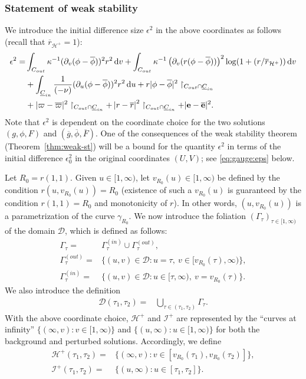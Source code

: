 \documentclass[10pt, reqno]{amsart}
\theoremstyle{definition}
\theoremstyle{remark}
\theoremstyle{conjecture}
\numberwithin{equation}{section}
\newcommand{\abs}[1]{\vert#1\vert}
\newcommand{\set}[1]{\{#1\}}
\newcommand{\ud}{\mathrm{d}}
\newcommand{\rd}{\partial}
\newcommand{\0}{\emptyset}
\newcommand{\gmm}{\gamma}
\newcommand{\Gmm}{\Gamma}
\newcommand{\eps}{\epsilon}
\newcommand{\kpp}{\kappa}
\newcommand{\bfe}{{\bf e}}
\newcommand{\calD}{\mathcal D}
\newcommand{\calH}{\mathcal H}
\newcommand{\calI}{\mathcal I}
\newcommand{\uC}{\underline{C}}
\newcommand{\dur}{\nu}
\newcommand{\EH}{\calH^{+}}
\newcommand{\e}{\bfe}							%
\newcommand{\NI}{\calI^{+}}						%
\newcommand{\gbg}{\overline{g}}					%
\newcommand{\Fbg}{\overline{F}}					%
\newcommand{\phibg}{\overline{\phi}}				%
\newcommand{\rbg}{\overline{r}}					%
\newcommand{\varpibg}{\overline{\varpi}}				%
\newcommand{\ebg}{\overline{\e}}					%
\newcommand{\Abs}[1]{\left\vert #1 \right\vert}
\begin{document}
\subsubsection*{Statement of weak stability}
We introduce the initial difference size $\eps^{2}$ in the above coordinates as follows (recall that $\rbg_{\EH} = 1$):
\begin{equation} \label{eq:eps-def}
\begin{aligned}
	\eps^{2} 
= 	& \int_{C_{out}} \kpp^{-1} (\rd_{v} (\phi - \phibg))^{2} r^{2} \, \ud v 
	+ \int_{C_{out}} \kpp^{-1} \left( \rd_{v} (r (\phi - \phibg)) \right)^{2} \log(1+(r/\rbg_{\EH})) \, \ud v \\
	& + \int_{\uC_{in}} \frac{1}{(-\dur)} (\rd_{u} (\phi - \phibg))^{2} r^{2} \, \ud u  
	+ r \abs{\phi - \phibg}^{2} \restriction_{C_{out} \cap \uC_{in}}		\\
	& + \abs{\varpi - \varpibg}^{2} \restriction_{C_{out} \cap \uC_{in}}
	+ \Abs{r - \rbg}^{2} \restriction_{C_{out} \cap \uC_{in}} 
	+ \abs{\e - \ebg}^{2} .
\end{aligned}
\end{equation}
Note that $\eps^{2}$ is dependent on the coordinate choice for the two solutions $(g, \phi, F)$ and $(\gbg, \phibg, \Fbg)$. One of the consequences of the weak stability theorem (Theorem~\ref{thm:weak-st}) will be a bound for the quantity $\eps^{2}$ in terms of the initial difference $\eps_{0}^{2}$ in the original coordinates $(U, V)$; see \eqref{eq:gauge:eps} below.

Let $R_{0} = r(1, 1)$.  Given $u \in [1, \infty)$, let $v_{R_{0}}(u) \in [1, \infty)$ be defined by the condition $r(u, v_{R_{0}}(u)) = R_{0}$ (existence of such a $v_{R_{0}}(u)$ is guaranteed by the condition $r(1, 1) = R_{0}$ and monotonicity of $r$). In other words, $(u, v_{R_{0}}(u))$ is a parametrization of the curve $\gmm_{R_{0}}$. We now introduce the foliation $(\Gmm_{\tau})_{\tau \in [1, \infty)}$ of the domain $\calD$, which is defined as follows:
\begin{align*}
	\Gmm_{\tau} = & \Gmm_{\tau}^{(in)} \cup \Gmm_{\tau}^{(out)}, \\
	\Gmm_{\tau}^{(out)} = & \set{(u, v) \in \calD : u = \tau, \ v \in [v_{R_{0}}(\tau), \infty)}, \\
	\Gmm_{\tau}^{(in)} = & \set{(u, v) \in \calD : u \in [\tau, \infty), \ v  = v_{R_{0}}(\tau)}.
\end{align*}
We also introduce the definition
\begin{align*}
	\calD(\tau_{1}, \tau_{2}) =& \bigcup_{\tau \in (\tau_{1}, \tau_{2})} \Gmm_{\tau}.
\end{align*}
With the above coordinate choice, $\EH$ and $\NI$ are represented by the ``curves at infinity'' $\set{(\infty, v) : v \in [1, \infty)}$ and $\set{(u, \infty) : u \in [1, \infty)}$ for both the background and perturbed solutions. Accordingly, we define
\begin{align*}
	\EH(\tau_{1}, \tau_{2}) =& \set{(\infty, v) : v \in [v_{R_{0}}(\tau_{1}), v_{R_{0}}(\tau_{2})]} , \\
	\NI(\tau_{1}, \tau_{2}) =& \set{(u, \infty) : u \in [\tau_{1}, \tau_{2}]} .
\end{align*}
\end{document}
